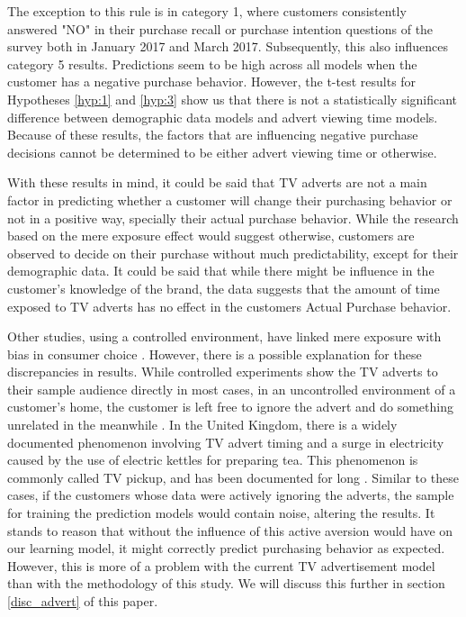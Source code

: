 \documentclass[review]{elsarticle}
\begin{document}
The exception to this rule is in category 1, where customers consistently answered "NO" in their purchase recall or purchase intention questions of the survey both in January 2017 and March 2017. Subsequently, this also influences category 5 results. Predictions seem to be high across all models when the customer has a negative purchase behavior. However, the t-test results for Hypotheses \ref{hyp:1} and \ref{hyp:3} show us that there is not a statistically significant difference between demographic data models and advert viewing time models. Because of these results, the factors that are influencing negative purchase decisions cannot be determined to be either advert viewing time or otherwise.

With these results in mind, it could be said that TV adverts are not a main factor in predicting whether a customer will change their purchasing behavior or not in a positive way, specially their actual purchase behavior. While the research based on the mere exposure effect would suggest otherwise, customers are observed to decide on their purchase without much predictability, except for their demographic data. It could be said that while there might be influence in the customer's knowledge of the brand, the data suggests that the amount of time exposed to TV adverts has no effect in the customers Actual Purchase behavior.

Other studies, using a controlled environment, have linked mere exposure with bias in consumer choice \cite{janiszewski}. However, there is a possible explanation for these discrepancies in results. While controlled experiments show the TV adverts to their sample audience directly in most cases, in an uncontrolled environment of a customer's home, the customer is left free to ignore the advert and do something unrelated in the meanwhile \cite{abernethy}. In the United Kingdom, there is a widely documented phenomenon involving TV advert timing and a surge in electricity caused by the use of electric kettles for preparing tea. This phenomenon is commonly called TV pickup, and has been documented for long \cite{bunn,boait}. Similar to these cases, if the customers whose data were actively ignoring the adverts, the sample for training the prediction models would contain noise, altering the results. It stands to reason that without the influence of this active aversion would have on our learning model, it might correctly predict purchasing behavior as expected. However, this is more of a problem with the current TV advertisement model than with the methodology of this study. We will discuss this further in section \ref{disc_advert} of this paper.
\end{document}
